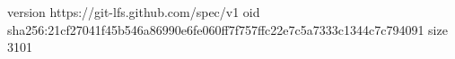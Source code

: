 version https://git-lfs.github.com/spec/v1
oid sha256:21cf27041f45b546a86990e6fe060ff7f757ffc22e7c5a7333c1344c7c794091
size 3101
